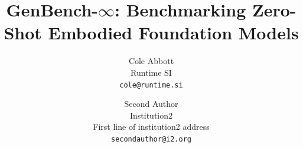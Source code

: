 \documentclass[10pt,twocolumn,letterpaper]{article}
\title{GenBench-$\infty$: Benchmarking Zero-Shot Embodied Foundation Models}
\author{Cole Abbott\\
Runtime SI\\
{\tt\small cole@runtime.si}
\and
Second Author\\
Institution2\\
First line of institution2 address\\
{\tt\small secondauthor@i2.org}
}
\begin{document}
\maketitle
    





{
    \small
    
    
}

% 
\end{document}
